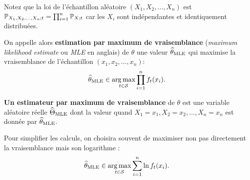 Notez que la loi de l'échantillon aléatoire $(X_1, X_2, \dots, X_n)$ est 
$  \mathbb{P}_{X_1, X_2, \dots, X_n ; t} = \prod_{i=1}^n \mathbb{P}_{X; t} $
car les $X_i$ sont indépendantes et identiquement distribuées.

On appelle alors \textbf{estimation par maximum de vraisemblance} ({\it maximum
  likelihood estimate} ou {\it MLE} en anglais) de $\theta$ une valeur
$\widehat{\theta}_{\text{MLE}}$ qui maximise la vraisemblance de l'échantillon
$(x_1, x_2, \dots, x_n)$:
\begin{equation}
  \label{eq:mle_estimator}
  \widehat{\theta}_{\text{MLE}} \in \operatorname*{arg\,max}_{t \in \mathcal{S}} \prod_{i=1}^n f_t(x_i).
\end{equation}

\textbf{Un estimateur par maximum de vraisemblance} de $\theta$ est une
variable aléatoire réelle $\widehat{\Theta}_{\text{MLE}}$ dont la valeur quand
$X_1=x_1, X_2=x_2, \dots, X_n=x_n$ est donnée par $\widehat{\theta}_{\text{MLE}}$.

Pour simplifier les calculs, on choisira souvent de maximiser non pas
directement la vraisemblance mais son logarithme :
\begin{equation}
  \label{eq:lmle_estimator} 
  \widehat{\theta}_{\text{MLE}} \in \operatorname*{arg\,max}_{t \in \mathcal{S}}\sum_{i=1}^n \ln f_t(x_i).
\end{equation}

